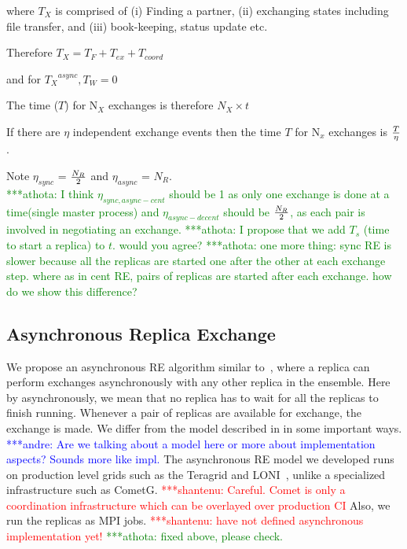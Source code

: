 \documentclass{rspublic}
\newcommand{\jhanote}[1]{ {\textcolor{red} { ***shantenu: #1 }}}
\newcommand{\alnote}[1]{ {\textcolor{blue} { ***andre: #1 }}}
\newcommand{\athotanote}[1]{ {\textcolor{green} { ***athota: #1 }}}
\newcommand{\alnote}[1]{}
\newcommand{\athotanote}[1]{}
\newcommand{\jhanote}[1]{}
\begin{document}
where $T_{X}$ is comprised of (i) Finding a partner, (ii) exchanging
states including file transfer, and (iii) book-keeping, status update
etc. 

Therefore ${T_{X}} = {T_F + T_{ex} + T_{coord}}$ 


and for ${T_{X}}^{async}, T_W = 0$


The time ($T$) for N$_{X}$ exchanges is therefore $N_{X} \times t$

If there are $\eta$ independent exchange events then the time $T$ for 
N$_x$ exchanges is $T \over \eta$.

Note $\eta_{sync}$ = $N_R \over 2$ and $\eta_{async}$ = $N_R $. \\
\athotanote{I think $\eta_{sync,async-cent}$ should be 1 as only one exchange is done at a time(single master process) and $\eta_{async-decent}$ should be $N_R \over 2$, as each pair is involved in negotiating an exchange.}
\athotanote{I propose that we add  $T_{s}$ (time to start a replica) to $t$. would you agree?}
\athotanote{one more thing: sync RE is slower because all the replicas are started one after the other at each exchange step. where as in cent RE, pairs of replicas are started after each exchange. how do we show this difference?}






  
\subsection{Asynchronous Replica Exchange}


We propose an asynchronous RE algorithm similar
to~\citep{parashar_arepex}, where a replica can perform exchanges
asynchronously with any other replica in the ensemble. Here by asynchronously, we mean that no replica has to wait for all the replicas to finish running. Whenever a pair of replicas are available for exchange, the exchange is made. %
We differ from the model described in \citep{parashar_arepex}
in some important ways. \alnote{Are we talking about a model here or 
more about implementation aspects? Sounds more like impl.}
The asynchronous RE model we developed runs on
production level grids such as the Teragrid and LONI~\citep{LONI_web},
unlike a specialized infrastructure such as CometG.
\jhanote{Careful. Comet is only a coordination infrastructure which
  can be overlayed over production CI} Also, we run the replicas as
MPI jobs. \jhanote{have not defined asynchronous implementation yet!} \athotanote{fixed above, please check.}
\end{document}
